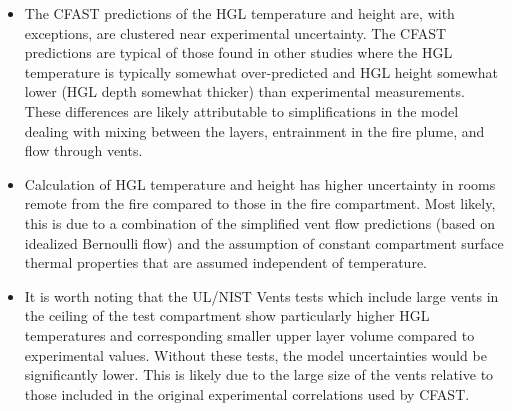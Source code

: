 \begin{itemize}
\item The CFAST predictions of the HGL temperature and height are, with exceptions, are clustered near experimental uncertainty. The CFAST predictions are typical of those found in other studies where the HGL temperature is typically somewhat over-predicted and HGL height somewhat lower (HGL depth somewhat thicker) than experimental measurements. These differences are likely attributable to simplifications in the model dealing with mixing between the layers, entrainment in the fire plume, and flow through vents.
\item Calculation of HGL temperature and height has higher uncertainty in rooms remote from the fire compared to those in the fire compartment.  Most likely, this is due to a combination of the simplified vent flow predictions (based on idealized Bernoulli flow) and the assumption of constant compartment surface thermal properties that are assumed independent of temperature.
\item It is worth noting that the UL/NIST Vents tests which include large vents in the ceiling of the test compartment show particularly higher HGL temperatures and corresponding smaller upper layer volume compared to experimental values.  Without these tests, the model uncertainties would be significantly lower.  This is likely due to the large size of the vents relative to those included in the original experimental correlations used by CFAST.
\end{itemize}




